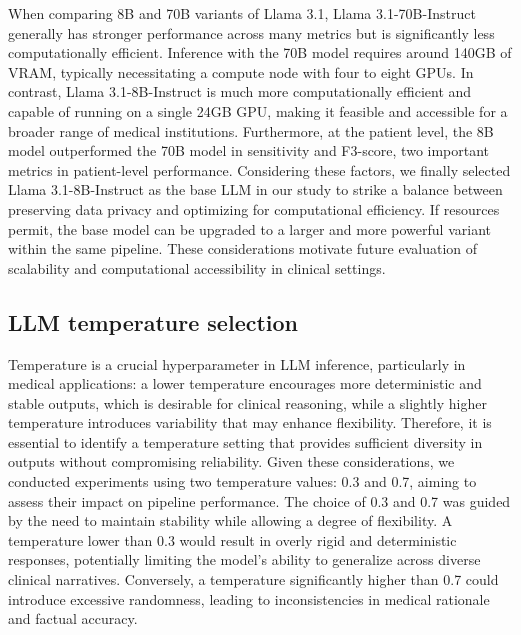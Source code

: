 \documentclass[fleqn,10pt]{wlscirep}
\begin{document}
When comparing 8B and 70B variants of Llama 3.1, Llama 3.1-70B-Instruct generally has stronger performance across many metrics but is significantly less computationally efficient. Inference with the 70B model requires around 140GB of VRAM, typically necessitating a compute node with four to eight GPUs. In contrast, Llama 3.1-8B-Instruct is much more computationally efficient and capable of running on a single 24GB GPU, making it feasible and accessible for a broader range of medical institutions. Furthermore, at the patient level, the 8B model outperformed the 70B model in sensitivity and F3-score, two important metrics in patient-level performance. Considering these factors, we finally selected Llama 3.1-8B-Instruct as the base LLM in our study to strike a balance between preserving data privacy and optimizing for computational efficiency. If resources permit, the base model can be upgraded to a larger and more powerful variant within the same pipeline. These considerations motivate future evaluation of scalability and computational accessibility in clinical settings.

\subsection*{LLM temperature selection}
Temperature is a crucial hyperparameter in LLM inference, particularly in medical applications: a lower temperature encourages more deterministic and stable outputs, which is desirable for clinical reasoning, while a slightly higher temperature introduces variability that may enhance flexibility. Therefore, it is essential to identify a temperature setting that provides sufficient diversity in outputs without compromising reliability. Given these considerations, we conducted experiments using two temperature values: 0.3 and 0.7, aiming to assess their impact on pipeline performance. The choice of 0.3 and 0.7 was guided by the need to maintain stability while allowing a degree of flexibility. A temperature lower than 0.3 would result in overly rigid and deterministic responses, potentially limiting the model’s ability to generalize across diverse clinical narratives. Conversely, a temperature significantly higher than 0.7 could introduce excessive randomness, leading to inconsistencies in medical rationale and factual accuracy. 
\end{document}

